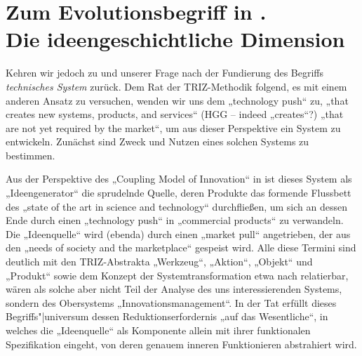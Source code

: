 \documentclass[11pt,a4paper]{article}
\begin{document}
\section{Zum Evolutionsbegriff in \cite{TESE2018}.\\ Die ideengeschichtliche
  Dimension}

Kehren wir jedoch zu \cite{TESE2018} und unserer Frage nach der Fundierung des
Begriffs \emph{technisches System} zurück. Dem Rat der TRIZ-Methodik folgend,
es mit einem anderen Ansatz zu versuchen, wenden wir uns dem „technology push“
\cite[S. 2]{TESE2018} zu, „that creates new systems, products, and services“
(HGG -- indeed „creates“?) „that are not yet required by the market“, um aus
dieser Perspektive ein System zu entwickeln. Zunächst sind Zweck und Nutzen
eines solchen Systems zu bestimmen.

Aus der Perspektive des „Coupling Model of Innovation“ in
\cite[fig. 3]{Preez2006} ist dieses System als „Ideengenerator“ die sprudelnde
Quelle, deren Produkte das formende Flussbett des „state of the art in science
and technology“ durchfließen, um sich an dessen Ende durch einen „technology
push“ in „commercial products“ zu verwandeln.  Die „Ideenquelle“ wird (ebenda)
durch einen „market pull“ angetrieben, der aus den „needs of society and the
marketplace“ gespeist wird.  Alle diese Termini sind deutlich mit den
TRIZ-Abstrakta „Werkzeug“, „Aktion“, „Objekt“ und „Produkt“ sowie dem Konzept
der Systemtransformation etwa nach \cite{TT} relatierbar, wären als solche
aber nicht Teil der Analyse des uns interessierenden Systems, sondern des
Obersystems „Innovationsmanagement“. In der Tat erfüllt dieses
Begriffs"|universum dessen Reduktionserfordernis „auf das Wesentliche“, in
welches die „Ideenquelle“ als Komponente allein mit ihrer funktionalen
Spezifikation eingeht, von deren genauem inneren Funktionieren abstrahiert
wird.
\end{document}
